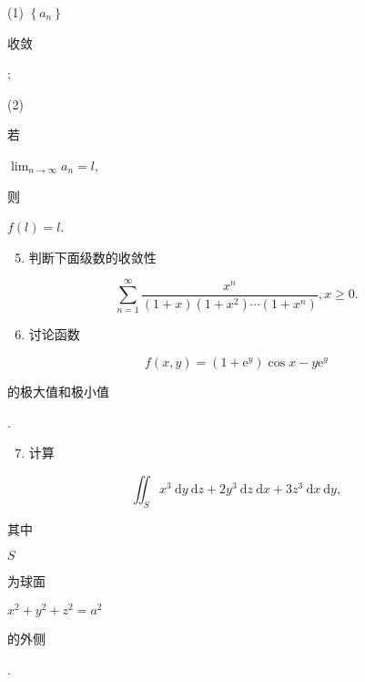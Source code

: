 \documentclass[10pt]{article}
\begin{document}
(1) $\left\{a_{n}\right\}$ \begin{CJK}{UTF8}{mj}收敛\end{CJK};

(2) \begin{CJK}{UTF8}{mj}若\end{CJK} $\lim _{n \rightarrow \infty} a_{n}=l$, \begin{CJK}{UTF8}{mj}则\end{CJK} $f(l)=l$.

\begin{enumerate}
  \setcounter{enumi}{4}
  \item \begin{CJK}{UTF8}{mj}判断下面级数的收敛性\end{CJK}
\end{enumerate}
$$
\sum_{n=1}^{\infty} \frac{x^{n}}{(1+x)\left(1+x^{2}\right) \cdots\left(1+x^{n}\right)}, x \geq 0 .
$$

\begin{enumerate}
  \setcounter{enumi}{5}
  \item \begin{CJK}{UTF8}{mj}讨论函数\end{CJK}
\end{enumerate}
$$
f(x, y)=\left(1+\mathrm{e}^{y}\right) \cos x-y \mathrm{e}^{y}
$$
\begin{CJK}{UTF8}{mj}的极大值和极小值\end{CJK}.

\begin{enumerate}
  \setcounter{enumi}{6}
  \item \begin{CJK}{UTF8}{mj}计算\end{CJK}
\end{enumerate}
$$
\iint_{S} x^{3} \mathrm{~d} y \mathrm{~d} z+2 y^{3} \mathrm{~d} z \mathrm{~d} x+3 z^{3} \mathrm{~d} x \mathrm{~d} y,
$$
\begin{CJK}{UTF8}{mj}其中\end{CJK} $S$ \begin{CJK}{UTF8}{mj}为球面\end{CJK} $x^{2}+y^{2}+z^{2}=a^{2}$ \begin{CJK}{UTF8}{mj}的外侧\end{CJK}.
\end{document}
